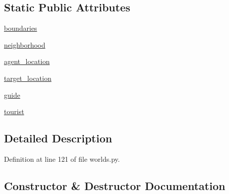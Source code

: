 \subsection*{Static Public Attributes}
\begin{DoxyCompactItemize}
\item 
\hyperlink{classparlai_1_1tasks_1_1talkthewalk_1_1worlds_1_1SimulateWorld_a4af404e8cd0ba091737ac83c212313db}{boundaries}
\item 
\hyperlink{classparlai_1_1tasks_1_1talkthewalk_1_1worlds_1_1SimulateWorld_abba0187065d0301544aeb3938776d567}{neighborhood}
\item 
\hyperlink{classparlai_1_1tasks_1_1talkthewalk_1_1worlds_1_1SimulateWorld_adc810464032ecbbcab43ae1469073bcc}{agent\+\_\+location}
\item 
\hyperlink{classparlai_1_1tasks_1_1talkthewalk_1_1worlds_1_1SimulateWorld_a0b116dd9980e163ec7a0565996677e97}{target\+\_\+location}
\item 
\hyperlink{classparlai_1_1tasks_1_1talkthewalk_1_1worlds_1_1SimulateWorld_af395c9415b1b93e19382a4fda023cf37}{guide}
\item 
\hyperlink{classparlai_1_1tasks_1_1talkthewalk_1_1worlds_1_1SimulateWorld_abfa37e958248323fcffa9455487dca0c}{tourist}
\end{DoxyCompactItemize}


\subsection{Detailed Description}


Definition at line 121 of file worlds.\+py.



\subsection{Constructor \& Destructor Documentation}
\mbox{\label{classparlai_1_1tasks_1_1talkthewalk_1_1worlds_1_1SimulateWorld_ab9073698c5054aaa0a605c946275cce4}} 
